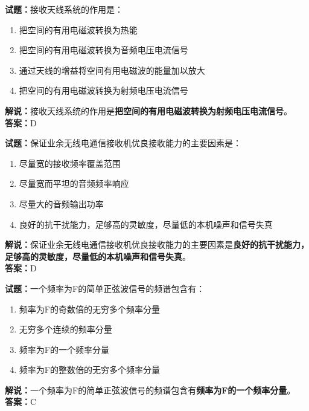 \documentclass{ctexbook}
\begin{document}
\bigskip


\noindent\textbf{试题：}接收天线系统的作用是：

\begin{enumerate}[leftmargin=3em]
	\item 把空间的有用电磁波转换为热能
	\item 把空间的有用电磁波转换为音频电压电流信号
	\item 通过天线的增益将空间有用电磁波的能量加以放大
	\item 把空间的有用电磁波转换为射频电压电流信号
\end{enumerate}

\noindent\textbf{解说：}接收天线系统的作用是\textbf{把空间的有用电磁波转换为射频电压电流信号}。\\\noindent\textbf{答案：}D%


\bigskip


\noindent\textbf{试题：}保证业余无线电通信接收机优良接收能力的主要因素是：

\begin{enumerate}[leftmargin=3em]
	\item 尽量宽的接收频率覆盖范围
	\item 尽量宽而平坦的音频频率响应
	\item 尽量大的音频输出功率
	\item 良好的抗干扰能力，足够高的灵敏度，尽量低的本机噪声和信号失真
\end{enumerate}

\noindent\textbf{解说：}保证业余无线电通信接收机优良接收能力的主要因素是\textbf{良好的抗干扰能力，足够高的灵敏度，尽量低的本机噪声和信号失真}。\\\noindent\textbf{答案：}D%


\bigskip


\noindent\textbf{试题：}一个频率为F的简单正弦波信号的频谱包含有：

\begin{enumerate}[leftmargin=3em]
	\item 频率为F的奇数倍的无穷多个频率分量
	\item 无穷多个连续的频率分量
	\item 频率为F的一个频率分量
	\item 频率为F的整数倍的无穷多个频率分量
\end{enumerate}

\noindent\textbf{解说：}一个频率为F的简单正弦波信号的频谱包含有\textbf{频率为F的一个频率分量}。\\\noindent\textbf{答案：}C%
\end{document}
